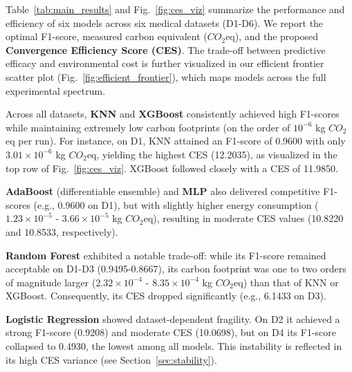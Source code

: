 \documentclass[conference]{IEEEtran}
\begin{document}
Table~\ref{tab:main_results} and Fig.~\ref{fig:ces_viz} summarize the performance and efficiency of six models across six medical datasets (D1-D6). We report the optimal F1-score, measured carbon equivalent (\(CO_2\)eq), and the proposed \textbf{Convergence Efficiency Score (CES)}. The trade-off between predictive efficacy and environmental cost is further visualized in our efficient frontier scatter plot (Fig.~\ref{fig:efficient_frontier}), which maps models across the full experimental spectrum.

Across all datasets, \textbf{KNN} and \textbf{XGBoost} consistently achieved high F1-scores while maintaining extremely low carbon footprints (on the order of \(10^{-6}\) kg \(CO_2\)eq per run). For instance, on D1, KNN attained an F1-score of 0.9600 with only \(3.01\times10^{-6}\) kg \(CO_2\)eq, yielding the highest CES (12.2035), as visualized in the top row of Fig.~\ref{fig:ces_viz}. XGBoost followed closely with a CES of 11.9850.  

\textbf{AdaBoost} (differentiable ensemble) and \textbf{MLP} also delivered competitive F1-scores (e.g., 0.9600 on D1), but with slightly higher energy consumption (\(1.23\times10^{-5}\) - \(3.66\times10^{-5}\) kg \(CO_2\)eq), resulting in moderate CES values (10.8220 and 10.8533, respectively).  

\textbf{Random Forest} exhibited a notable trade-off: while its F1-score remained acceptable on D1-D3 (0.9495-0.8667), its carbon footprint was one to two orders of magnitude larger (\(2.32\times10^{-4}\) - \(8.35\times10^{-4}\) kg \(CO_2\)eq) than that of KNN or XGBoost. Consequently, its CES dropped significantly (e.g., 6.1433 on D3).  

\textbf{Logistic Regression} showed dataset-dependent fragility. On D2 it achieved a strong F1-score (0.9208) and moderate CES (10.0698), but on D4 its F1-score collapsed to 0.4930, the lowest among all models. This instability is reflected in its high CES variance (see Section~\ref{sec:stability}).
\end{document}
